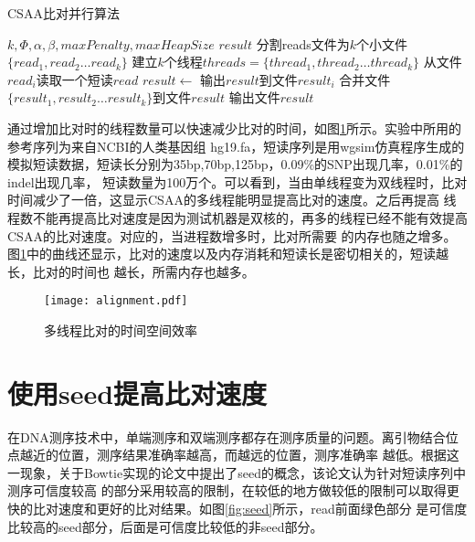 \begin{algorithm}
    \caption{CSAA比对并行算法}
    \label{alg:mt}
    \begin{algorithmic}[1]
        \Require $k,\Phi,\alpha,\beta,maxPenalty,maxHeapSize$
        \Ensure $result$
        \State 分割reads文件为$k$个小文件$\{read_1,read_2 \ldots read_k \}$
        \State 建立$k$个线程$threads=\{thread_1,thread_2\ldots thread_k\}$
            \State 从文件$read_i$读取一个短读$read$
            \State {}
            \State $result \gets $ 
            \State 输出$result$到文件$result_i$
        \EndFor
        \State 合并文件$\{result_1,result_2\ldots result_k\}$到文件$result$
        \State 输出文件$result$
        \EndFunction
    \end{algorithmic}
\end{algorithm}

通过增加比对时的线程数量可以快速减少比对的时间，如图\ref{fig:alignment}所示。实验中所用的参考序列为来自NCBI的人类基因组
hg19.fa，短读序列是用wgsim仿真程序生成的模拟短读数据，短读长分别为35bp,70bp,125bp，0.09\%的SNP出现几率，0.01\%的indel出现几率，
短读数量为100万个。可以看到，当由单线程变为双线程时，比对时间减少了一倍，这显示CSAA的多线程能明显提高比对的速度。之后再提高
线程数不能再提高比对速度是因为测试机器是双核的，再多的线程已经不能有效提高CSAA的比对速度。对应的，当进程数增多时，比对所需要
的内存也随之增多。图\ref{fig:alignment}中的曲线还显示，比对的速度以及内存消耗和短读长是密切相关的，短读越长，比对的时间也
越长，所需内存也越多。

\begin{figure}[tbp]
    \centering
    \texttt{[image: alignment.pdf]}
    \caption{多线程比对的时间空间效率} \label{fig:alignment}
\end{figure}

\section{使用seed提高比对速度}
在DNA测序技术中，单端测序和双端测序都存在测序质量的问题。离引物结合位点越近的位置，测序结果准确率越高，而越远的位置，测序准确率
越低。根据这一现象，关于Bowtie实现的论文\cite{langmead2009ultrafast}中提出了seed的概念，该论文认为针对短读序列中测序可信度较高
的部分采用较高的限制，在较低的地方做较低的限制可以取得更快的比对速度和更好的比对结果。如图\ref{fig:seed}所示，read前面绿色部分
是可信度比较高的seed部分，后面是可信度比较低的非seed部分。

